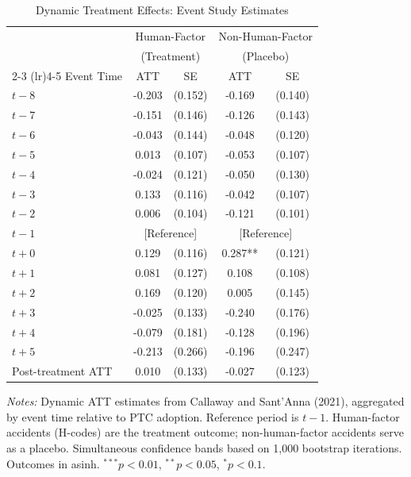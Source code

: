 \begin{table}[!t]
\centering
\caption{Dynamic Treatment Effects: Event Study Estimates}
\label{tab:eventstudy}
\small
\begin{tabular}{lcccc}
\toprule
& \multicolumn{2}{c}{Human-Factor} & \multicolumn{2}{c}{Non-Human-Factor} \\
& \multicolumn{2}{c}{(Treatment)} & \multicolumn{2}{c}{(Placebo)} \\
\cmidrule(lr){2-3} \cmidrule(lr){4-5}
Event Time & ATT & SE & ATT & SE \\
\midrule
$t-8$ & -0.203 & (0.152) & -0.169 & (0.140) \\
$t-7$ & -0.151 & (0.146) & -0.126 & (0.143) \\
$t-6$ & -0.043 & (0.144) & -0.048 & (0.120) \\
$t-5$ & 0.013 & (0.107) & -0.053 & (0.107) \\
$t-4$ & -0.024 & (0.121) & -0.050 & (0.130) \\
$t-3$ & 0.133 & (0.116) & -0.042 & (0.107) \\
$t-2$ & 0.006 & (0.104) & -0.121 & (0.101) \\
$t-1$ & \multicolumn{2}{c}{[Reference]} & \multicolumn{2}{c}{[Reference]} \\
$t+0$ & 0.129 & (0.116) & 0.287** & (0.121) \\
$t+1$ & 0.081 & (0.127) & 0.108 & (0.108) \\
$t+2$ & 0.169 & (0.120) & 0.005 & (0.145) \\
$t+3$ & -0.025 & (0.133) & -0.240 & (0.176) \\
$t+4$ & -0.079 & (0.181) & -0.128 & (0.196) \\
$t+5$ & -0.213 & (0.266) & -0.196 & (0.247) \\
\midrule
Post-treatment ATT & 0.010 & (0.133) & -0.027 & (0.123) \\
\bottomrule
\end{tabular}
\par\vspace{0.3em}
\parbox{\textwidth}{\footnotesize
\textit{Notes:} Dynamic ATT estimates from Callaway and Sant'Anna (2021), aggregated by event time relative to PTC adoption. Reference period is $t-1$. Human-factor accidents (H-codes) are the treatment outcome; non-human-factor accidents serve as a placebo. Simultaneous confidence bands based on 1,000 bootstrap iterations. Outcomes in asinh.
$^{***}p<0.01$, $^{**}p<0.05$, $^{*}p<0.1$.
}
\end{table}
